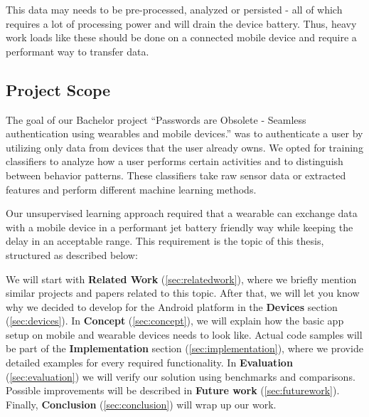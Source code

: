 This data may needs to be pre-processed, analyzed or persisted - all of which requires a lot of processing power and will drain the device battery.
Thus, heavy work loads like these should be done on a connected mobile device and require a performant way to transfer data.

\subsection{Project Scope}
\label{sec:intro:scope}
The goal of our Bachelor project ``Passwords are Obsolete - Seamless authentication using wearables and mobile devices.'' was to authenticate a user by utilizing only data from devices that the user already owns.
We opted for training classifiers to analyze how a user performs certain activities and to distinguish between behavior patterns. These classifiers take raw sensor data or extracted features and perform different machine learning methods.

Our unsupervised learning approach required that a wearable can exchange data with a mobile device in a performant jet battery friendly way while keeping the delay in an acceptable range.
This requirement is the topic of this thesis, structured as described below:

We will start with \textbf{Related Work} (\ref{sec:relatedwork}), where we briefly mention similar projects and papers related to this topic.
After that, we will let you know why we decided to develop for the Android platform in the \textbf{Devices} section (\ref{sec:devices}).
In \textbf{Concept} (\ref{sec:concept}), we will explain how the basic app setup on mobile and wearable devices needs to look like.
Actual code samples will be part of the \textbf{Implementation} section (\ref{sec:implementation}), where we provide detailed examples for every required functionality.
In \textbf{Evaluation} (\ref{sec:evaluation}) we will verify our solution using benchmarks and comparisons.
Possible improvements will be described in \textbf{Future work} (\ref{sec:futurework}).
Finally, \textbf{Conclusion} (\ref{sec:conclusion}) will wrap up our work.


\clearpage
